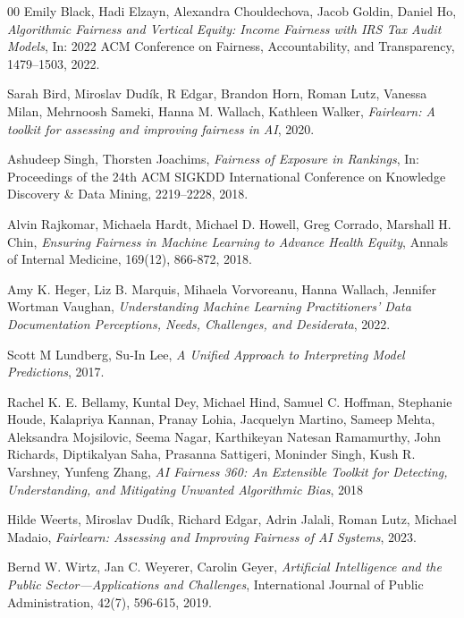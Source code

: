 \documentclass[fleqn,10pt]{wlscirep}
\begin{document}
\begin{thebibliography}{00}
  Emily Black, Hadi Elzayn, Alexandra Chouldechova, Jacob Goldin, Daniel Ho,
  \textit{Algorithmic Fairness and Vertical Equity: Income Fairness with IRS Tax Audit Models},
  In: 2022 ACM Conference on Fairness, Accountability, and Transparency,
  1479–1503,
  2022.


  Sarah Bird, Miroslav Dud\'ik, R Edgar, Brandon Horn, Roman Lutz, Vanessa Milan, Mehrnoosh Sameki, Hanna M. Wallach, Kathleen Walker,
  \textit{Fairlearn: A toolkit for assessing and improving fairness in AI},
  2020.


  Ashudeep Singh, Thorsten Joachims,
  \textit{Fairness of Exposure in Rankings},
  In: Proceedings of the 24th ACM SIGKDD International Conference on Knowledge Discovery \& Data Mining,
  2219–2228,
  2018.


  Alvin Rajkomar, Michaela Hardt, Michael D. Howell, Greg Corrado, Marshall H. Chin,
  \textit{Ensuring Fairness in Machine Learning to Advance Health Equity},
  Annals of Internal Medicine,
  169(12),
  866-872,
  2018.


  Amy K. Heger, Liz B. Marquis, Mihaela Vorvoreanu, Hanna Wallach, Jennifer Wortman Vaughan,
  \textit{Understanding Machine Learning Practitioners' Data Documentation Perceptions, Needs, Challenges, and Desiderata},
  2022.


  Scott M Lundberg, Su-In Lee,
  \textit{A Unified Approach to Interpreting Model Predictions},
  2017.


  Rachel K. E. Bellamy, Kuntal Dey, Michael Hind, Samuel C. Hoffman, Stephanie Houde, Kalapriya Kannan, Pranay Lohia, Jacquelyn Martino, Sameep Mehta, Aleksandra Mojsilovic, Seema Nagar, Karthikeyan Natesan Ramamurthy, John Richards, Diptikalyan Saha, Prasanna Sattigeri, Moninder Singh, Kush R. Varshney, Yunfeng Zhang,
  \textit{{AI Fairness} 360:  An Extensible Toolkit for Detecting, Understanding, and Mitigating Unwanted Algorithmic Bias},
  {2018}   %


  Hilde Weerts, Miroslav Dudík, Richard Edgar, Adrin Jalali, Roman Lutz, Michael Madaio,
  \textit{Fairlearn: Assessing and Improving Fairness of AI Systems},
  2023.


  Bernd W. Wirtz, Jan C. Weyerer, Carolin Geyer,
  \textit{Artificial Intelligence and the Public Sector—Applications and Challenges},
  International Journal of Public Administration,
  42(7),
  596-615,
  2019.



\end{thebibliography}
\end{document}
